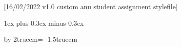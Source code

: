 
[16/02/2022 v1.0 custom anu student assignment stylefile]

\RequirePackage{tcolorbox}
\RequirePackage{environ}

\newcommand{\module}{Module}
\newcommand{\university}{National Taiwan University}
\newcommand{\department}{Economics}
\newcommand{\term}{}
\newcommand{\membername}{}
\newcommand{\memberuid}{}

\newcommand{\setmodule}[1]{\renewcommand{\module}{#1}}
\newcommand{\setuniversity}[1]{\renewcommand{\university}{#1}}
\newcommand{\setdepartment}[1]{\renewcommand{\department}{#1}}
\newcommand{\setterm}[1]{\renewcommand{\term}{#1}}
\newcommand{\setmembername}[1]{\renewcommand{\membername}{#1}}
\newcommand{\setmemberuid}[1]{\renewcommand{\memberuid}{#1}}


\def\ensuremath#1{\relax\ifmmode #1\else $#1$\fi}

\parindent 0pt
\parskip   1ex plus 0.3ex minus 0.3ex

\textheight 23.9cm
\textwidth  16cm
\topmargin  -2cm
\leftmargin -1cm
\advance\hsize by 2truecm\hoffset = -1.5truecm

\frenchspacing
\sloppy


\usepackage{mdframed}
\usepackage{etoolbox}

\newcommand{\header}{%
    {\bf \university} \hfill \term  \\
    {\bf \department} \hfill \@title \\
        Group member name(s): \membername \\
        Group member UID(s): \memberuid
        \begin{center}
            {\bf{\Large\module}}
        \end{center}
    }

\newenvironment{answer}[1][]{
        \par \medskip
        {\textbf{Answer to #1}}
        \par
        \begin{mdframed}[backgroundcolor=gray!10!white]
    }
    {
        \end{mdframed}
    }
    
\newenvironment{remarks}[1][]{
        \par \medskip
        {\textbf{Remarks to #1}}
        \par
        \begin{mdframed}[backgroundcolor=gray!10!white]
    }
    {
        \end{mdframed}
    }
